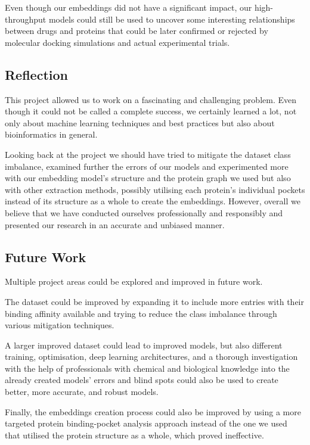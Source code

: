 Even though our embeddings did not have a significant impact, our high-throughput models could still be used to uncover some interesting relationships between drugs and proteins that could be later confirmed or rejected by molecular docking simulations and actual experimental trials.

\subsection{Reflection}

This project allowed us to work on a fascinating and challenging problem. Even though it could not be called a complete success, we certainly learned a lot, not only about machine learning techniques and best practices but also about bioinformatics in general.

Looking back at the project we should have tried to mitigate the dataset class imbalance, examined further the errors of our models and experimented more with our embedding model's structure and the protein graph we used but also with other extraction methods, possibly utilising each protein's individual pockets instead of its structure as a whole to create the embeddings. However, overall we believe that we have conducted ourselves professionally and responsibly and presented our research in an accurate and unbiased manner. 

\subsection{Future Work}

Multiple project areas could be explored and improved in future work.

The dataset could be improved by expanding it to include more entries with their binding affinity available and trying to reduce the class imbalance through various mitigation techniques. 

A larger improved dataset could lead to improved models, but also different training, optimisation, deep learning architectures, and a thorough investigation with the help of professionals with chemical and biological knowledge into the already created models' errors and blind spots could also be used to create better, more accurate, and robust models.

Finally, the embeddings creation process could also be improved by using a more targeted protein binding-pocket analysis approach instead of the one we used that utilised the protein structure as a whole, which proved ineffective.






